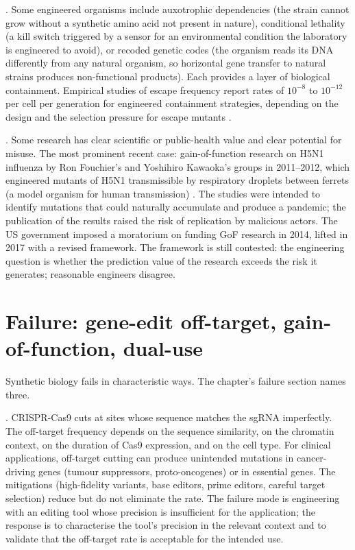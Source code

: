 . Some engineered organisms include
auxotrophic dependencies (the strain cannot grow without a synthetic
amino acid not present in nature), conditional lethality (a
kill switch triggered by a sensor for an environmental condition the
laboratory is engineered to avoid), or recoded genetic codes (the
organism reads its DNA differently from any natural organism, so
horizontal gene transfer to natural strains produces non-functional
products). Each provides a layer of biological containment.
Empirical studies of escape frequency report rates of $10^{-8}$ to
$10^{-12}$ per cell per generation for engineered containment
strategies, depending on the design and the selection pressure for
escape mutants \cite[pp.~115--118]{paper:v6c09-rovner-genetic-code-2015}.

. Some research has
clear scientific or public-health value and clear potential for
misuse. The most prominent recent case: gain-of-function research on
H5N1 influenza by Ron Fouchier's and Yoshihiro Kawaoka's groups in
2011--2012, which engineered mutants of H5N1 transmissible by
respiratory droplets between ferrets (a model organism for human
transmission) \cite[pp.~534--541]{paper:v6c09-imai-h5n1-2012}. The studies
were intended to identify mutations that could naturally accumulate
and produce a pandemic; the publication of the results raised the
risk of replication by malicious actors. The US government imposed a
moratorium on funding GoF research in 2014, lifted in 2017 with a
revised framework. The framework is still contested: the engineering
question is whether the prediction value of the research exceeds the
risk it generates; reasonable engineers disagree.

\section{Failure: gene-edit off-target, gain-of-function, dual-use}

Synthetic biology fails in characteristic ways. The chapter's
failure section names three.

. CRISPR-Cas9 cuts at sites
whose sequence matches the sgRNA imperfectly. The off-target
frequency depends on the sequence similarity, on the chromatin
context, on the duration of Cas9 expression, and on the cell type.
For clinical applications, off-target cutting can produce unintended
mutations in cancer-driving genes (tumour suppressors, proto-oncogenes)
or in essential genes. The mitigations (high-fidelity variants, base
editors, prime editors, careful target selection) reduce but do not
eliminate the rate. The failure mode is engineering with an editing
tool whose precision is insufficient for the application; the
response is to characterise the tool's precision in the relevant
context and to validate that the off-target rate is acceptable for
the intended use.

